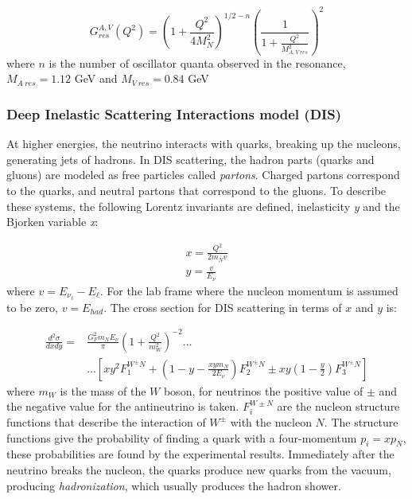 \begin{equation}
    G^{A,V}_{res} (Q^2)= \left(1+ \frac{Q^2}{4M^2_N}\right)^{1/2-n}\left(\frac{1}{1+\frac{Q^2}{M^2_{A,V\ res}}} \right)^2
\end{equation}
where $n$ is the number of oscillator quanta observed in the resonance, $M_{A\ res} = 1.12$ GeV and $M_{V\ res} = 0.84$ GeV


\subsubsection{Deep Inelastic Scattering Interactions model (DIS)}
\label{Cap:Int:NuInteractions:DISmodel}

At higher energies, the neutrino interacts with quarks, breaking up the nucleons, generating jets of hadrons. In DIS scattering, the hadron parts (quarks and gluons) are modeled as free particles called \textit{partons}. Charged partons correspond to the quarks, and neutral partons that correspond to the gluons. To describe these systems, the following Lorentz invariants are defined, inelasticity \textit{y} and the Bjorken variable \textit{x}:

\begin{equation}
    \begin{split}
        x = \frac{Q^2}{2m_N v} \\
        y = \frac{v}{E_\nu}
    \end{split}
\end{equation}
where $v= E_{\nu_\ell} - E_\ell$. For the lab frame where the nucleon momentum is assumed to be zero, $v = E_{had}$.
The cross section for DIS scattering in terms of $x$ and $y$ is:

\begin{equation}
    \begin{split}
        \frac{d^2\sigma}{dxdy}= & \frac{G^2_F m_N E_\nu}{\pi}\left(1 + \frac{Q^2}{m^2_W}\right)^{-2} \dots\\
        & \dots \left[xy^2F^{W^\pm N}_1 + \left(1-y-\frac{xym_N}{2E_\nu} \right)F^{W^\pm N}_2 \pm  xy\left(1-\frac{y}{2}\right)F^{W^\pm N}_3  \right]
    \end{split}
\end{equation}
where $m_W$ is the mass of the $W$ boson, for neutrinos the positive value of $\pm$ and the negative value for the antineutrino is taken. $F^{W\pm N}_i$ are the nucleon structure functions that describe the interaction of $W^\pm$ with the nucleon $N$. The structure functions give the probability of finding a quark with a four-momentum $p_i = xp_N$, these probabilities are found by the experimental results. Immediately after the neutrino breaks the nucleon, the quarks produce new quarks from the vacuum, producing \textit{hadronization}, which usually produces the hadron shower. 
